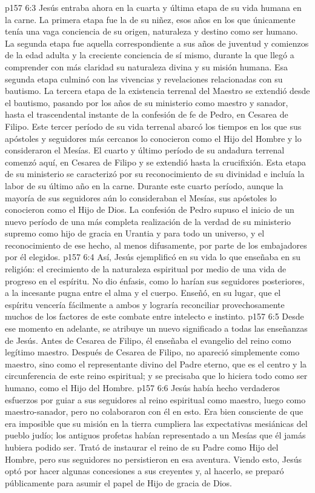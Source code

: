 \vs p157 6:3 Jesús entraba ahora en la cuarta y última etapa de su vida humana en la carne. La primera etapa fue la de su niñez, esos años en los que únicamente tenía una vaga conciencia de su origen, naturaleza y destino como ser humano. La segunda etapa fue aquella correspondiente a sus años de juventud y comienzos de la edad adulta y la creciente conciencia de sí mismo, durante la que llegó a comprender con más claridad su naturaleza divina y su misión humana. Esa segunda etapa culminó con las vivencias y revelaciones relacionadas con su bautismo. La tercera etapa de la existencia terrenal del Maestro se extendió desde el bautismo, pasando por los años de su ministerio como maestro y sanador, hasta el trascendental instante de la confesión de fe de Pedro, en Cesarea de Filipo. Este tercer período de su vida terrenal abarcó los tiempos en los que sus apóstoles y seguidores más cercanos lo conocieron como el Hijo del Hombre y lo consideraron el Mesías. El cuarto y último período de su andadura terrenal comenzó aquí, en Cesarea de Filipo y se extendió hasta la crucifixión. Esta etapa de su ministerio se caracterizó por su reconocimiento de su divinidad e incluía la labor de su último año en la carne. Durante este cuarto período, aunque la mayoría de sus seguidores aún lo consideraban el Mesías, sus apóstoles lo conocieron como el Hijo de Dios. La confesión de Pedro supuso el inicio de un nuevo período de una más completa realización de la verdad de su ministerio supremo como hijo de gracia en Urantia y para todo un universo, y el reconocimiento de ese hecho, al menos difusamente, por parte de los embajadores por él elegidos.
\vs p157 6:4 Así, Jesús ejemplificó en su vida lo que enseñaba en su religión: el crecimiento de la naturaleza espiritual por medio de una vida de progreso en el espíritu. No dio énfasis, como lo harían sus seguidores posteriores, a la incesante pugna entre el alma y el cuerpo. Enseñó, en su lugar, que el espíritu vencería fácilmente a ambos y lograría reconciliar provechosamente muchos de los factores de este combate entre intelecto e instinto.
\vs p157 6:5 \pc Desde ese momento en adelante, se atribuye un nuevo significado a todas las enseñanzas de Jesús. Antes de Cesarea de Filipo, él enseñaba el evangelio del reino como legítimo maestro. Después de Cesarea de Filipo, no apareció simplemente como maestro, sino como el representante divino del Padre eterno, que es el centro y la circunferencia de este reino espiritual; y se precisaba que lo hiciera todo como ser humano, como el Hijo del Hombre.
\vs p157 6:6 Jesús había hecho verdaderos esfuerzos por guiar a sus seguidores al reino espiritual como maestro, luego como maestro\hyp{}sanador, pero no colaboraron con él en esto. Era bien consciente de que era imposible que su misión en la tierra cumpliera las expectativas mesiánicas del pueblo judío; los antiguos profetas habían representado a un Mesías que él jamás hubiera podido ser. Trató de instaurar el reino de su Padre como Hijo del Hombre, pero sus seguidores no persistieron en esa aventura. Viendo esto, Jesús optó por hacer algunas concesiones a sus creyentes y, al hacerlo, se preparó públicamente para asumir el papel de Hijo de gracia de Dios.
